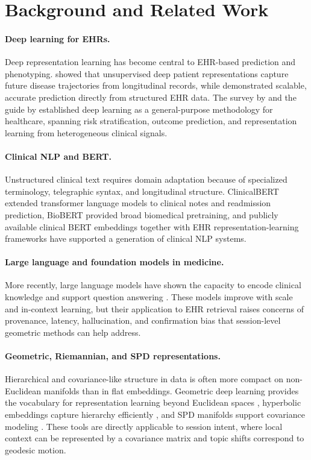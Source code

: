 \documentclass[preprint,12pt]{elsarticle}
\begin{document}
\section{Background and Related Work}

\paragraph{Deep learning for EHRs.} Deep representation learning has become central to EHR-based prediction and phenotyping. \citep{miotto2016} showed that unsupervised deep patient representations capture future disease trajectories from longitudinal records, while \citep{rajkomar2018} demonstrated scalable, accurate prediction directly from structured EHR data. The survey by \citep{shickel2017} and the guide by \citep{esteva19} established deep learning as a general-purpose methodology for healthcare, spanning risk stratification, outcome prediction, and representation learning from heterogeneous clinical signals.

\paragraph{Clinical NLP and BERT.} Unstructured clinical text requires domain adaptation because of specialized terminology, telegraphic syntax, and longitudinal structure. ClinicalBERT \citep{huang2019_clinicalbert} extended transformer language models to clinical notes and readmission prediction, BioBERT \citep{lee2020_biobert} provided broad biomedical pretraining, and publicly available clinical BERT embeddings \citep{alsentzer2019} together with EHR representation-learning frameworks \citep{weng19} have supported a generation of clinical NLP systems.

\paragraph{Large language and foundation models in medicine.} More recently, large language models have shown the capacity to encode clinical knowledge and support question answering \citep{singhal23}. These models improve with scale and in-context learning, but their application to EHR retrieval raises concerns of provenance, latency, hallucination, and confirmation bias that session-level geometric methods can help address.

\paragraph{Geometric, Riemannian, and SPD representations.} Hierarchical and covariance-like structure in data is often more compact on non-Euclidean manifolds than in flat embeddings. Geometric deep learning provides the vocabulary for representation learning beyond Euclidean spaces \citep{bronstein2017}, hyperbolic embeddings capture hierarchy efficiently \citep{nickel2017_poincare}, and SPD manifolds support covariance modeling \citep{lopez2021,zhao23}. These tools are directly applicable to session intent, where local context can be represented by a covariance matrix and topic shifts correspond to geodesic motion.
\end{document}
